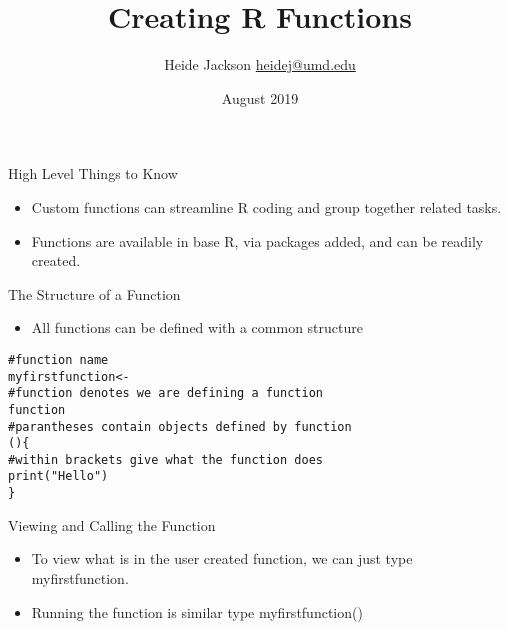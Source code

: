 \documentclass{beamer}
\title{Creating R Functions}
\author{\texorpdfstring{Heide Jackson \newline\url{heidej@umd.edu}}{Author}}
\institute{University of Maryland Population Research Center}
\date{August 2019}
\begin{document}
\maketitle
\begin{frame}{High Level Things to Know}
\begin{itemize}
\item Custom functions can streamline R coding and group together related tasks.
\item Functions are available in base R, via packages added, and can be readily created.
\end{itemize}
\end{frame}


\begin{frame}[fragile]{The Structure of a Function}
\begin{itemize}
    \item All functions can be defined with a common structure
\end{itemize}
\begin{verbatim}
#function name
myfirstfunction<-
#function denotes we are defining a function
function
#parantheses contain objects defined by function
(){
#within brackets give what the function does
print("Hello")
}
\end{verbatim}
\end{frame}


\begin{frame}[fragile]{Viewing and Calling the Function}
\begin{itemize}
    \item To view what is in the user created function, we can just type myfirstfunction.
    \item Running the function is similar type myfirstfunction()
\end{itemize}
\end{frame}
\end{document}
